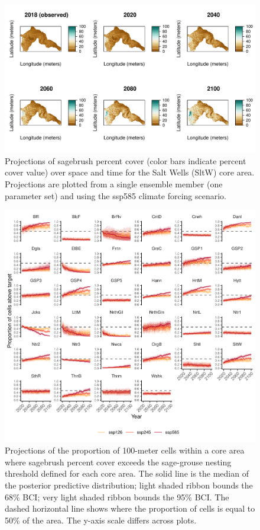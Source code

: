 \documentclass[
  12pt,
]{article}
\begin{document}
\begin{figure}
\centering
\includegraphics{sageCastManuscript_files/figure-latex/spatial-projections-1.pdf}
\caption{\label{fig:spatial-projections}Projections of sagebrush percent cover (color bars indicate percent cover value) over space and time for the Salt Wells (SltW) core area. Projections are plotted from a single ensemble member (one parameter set) and using the ssp585 climate forcing scenario.}
\end{figure}

\begin{figure}
\centering
\includegraphics{sageCastManuscript_files/figure-latex/nesting-targs-1.pdf}
\caption{\label{fig:nesting-targs}Projections of the proportion of 100-meter cells within a core area where sagebrush percent cover exceeds the sage-grouse nesting threshold defined for each core area. The solid line is the median of the posterior predictive distribution; light shaded ribbon bounds the 68\% BCI; very light shaded ribbon bounds the 95\% BCI. The dashed horizontal line shows where the proportion of cells is equal to 50\% of the area. The y-axis scale differs across plots.}
\end{figure}
\end{document}
